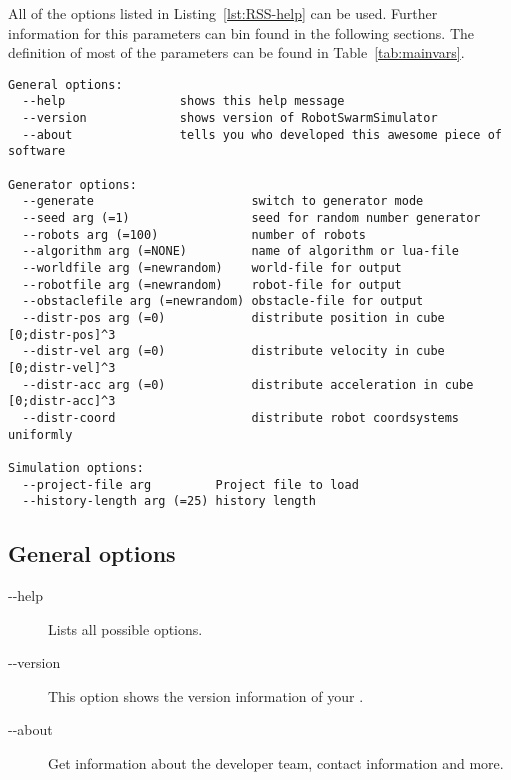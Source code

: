\documentclass[a4paper,halfparskip,11pt,twoside]{scrartcl}
\begin{document}
All of the options listed in Listing~\ref{lst:RSS-help} can be used. Further information for this parameters can bin found in the following sections. The definition of most of the parameters can be found in Table~\ref{tab:mainvars}.

\begin{lstlisting}[caption={RSS Helpline},label=lst:RSS-help]
General options:
  --help                shows this help message
  --version             shows version of RobotSwarmSimulator
  --about               tells you who developed this awesome piece of software

Generator options:
  --generate                      switch to generator mode
  --seed arg (=1)                 seed for random number generator
  --robots arg (=100)             number of robots
  --algorithm arg (=NONE)         name of algorithm or lua-file
  --worldfile arg (=newrandom)    world-file for output
  --robotfile arg (=newrandom)    robot-file for output
  --obstaclefile arg (=newrandom) obstacle-file for output
  --distr-pos arg (=0)            distribute position in cube [0;distr-pos]^3
  --distr-vel arg (=0)            distribute velocity in cube [0;distr-vel]^3
  --distr-acc arg (=0)            distribute acceleration in cube [0;distr-acc]^3
  --distr-coord                   distribute robot coordsystems uniformly

Simulation options:
  --project-file arg         Project file to load
  --history-length arg (=25) history length

\end{lstlisting}


\subsection{General options}
\begin{description}
	\item [-{}-help] Lists all possible options.
	\item [-{}-version] This option shows the version information of your \RSS.
	\item [-{}-about] Get information about the developer team, contact information and more.
\end{description}
\end{document}
